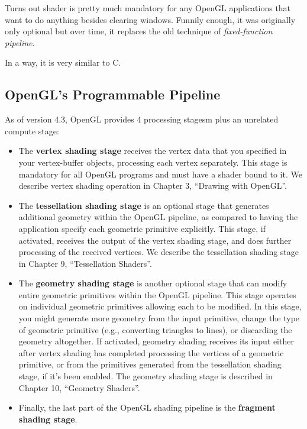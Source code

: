 \documentclass[a4paper, 14pt]{extarticle}
\begin{document}
Turns out shader is pretty much mandatory for any OpenGL applications that want to do anything besides clearing windows.
Funnily enough, it was originally only optional but over time, it replaces the old technique of \textit{fixed-function pipeline}.

In a way, it is very similar to C.

\subsection{OpenGL's Programmable Pipeline}

As of version 4.3, OpenGL provides 4 processing stagesm plus an unrelated compute stage:

\begin{itemize}
    \item
          The \textbf{vertex shading stage} receives the vertex data that you specified in your vertex-buffer objects, processing each vertex separately.
          This stage is mandatory for all OpenGL programs and must have a shader bound to it.
          We describe vertex shading operation in Chapter 3, ``Drawing with OpenGL''.
    \item
          The \textbf{tessellation shading stage} is an optional stage that generates additional geometry within the OpenGL pipeline, as compared to having the application specify each geometric primitive explicitly.
          This stage, if activated, receives the output of the vertex shading stage, and does further processing of the received vertices.
          We describe the tessellation shading stage in Chapter 9, ``Tessellation Shaders''.
    \item
          The \textbf{geometry shading stage} is another optional stage that can modify entire geometric primitives within the OpenGL pipeline.
          This stage operates on individual geometric primitives allowing each to be modified.
          In this stage, you might generate more geometry from the input primitive, change the type of geometric primitive (e.g., converting triangles to lines), or discarding the geometry altogether.
          If activated, geometry shading receives its input either after vertex shading has completed processing the vertices of a geometric primitive, or from the primitives generated from the tessellation shading stage, if it's been enabled.
          The geometry shading stage is described in Chapter 10, ``Geometry Shaders''.
    \item
          Finally, the last part of the OpenGL shading pipeline is the \textbf{fragment shading stage}.

\end{itemize}
\end{document}
